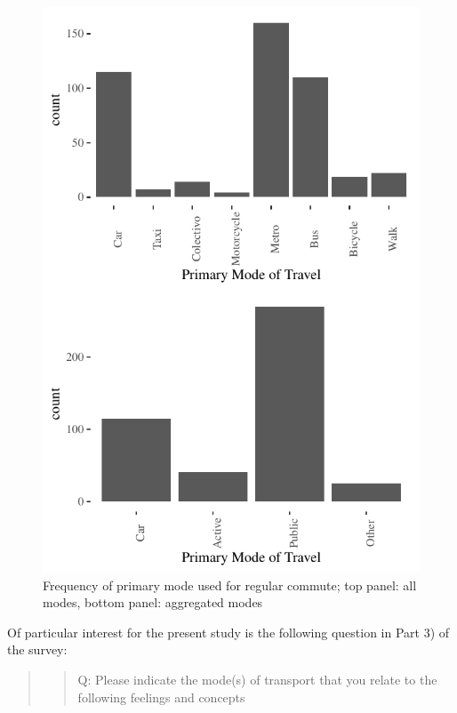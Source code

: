 \documentclass[]{elsarticle} %
\makeatletter
\def\maxwidth{\ifdim\Gin@nat@width>\linewidth\linewidth
\else\Gin@nat@width\fi}
\let\Oldincludegraphics\includegraphics
\renewcommand{\includegraphics}[1]{\Oldincludegraphics[width=\maxwidth]{#1}}
\makeatother
\begin{document}
\begin{figure}
\centering
\includegraphics{Dissonance_Santiago_v1_files/figure-latex/figure-primary-mode-travel-1.pdf}
\caption{\label{fig:primary-mode-travel}Frequency of primary mode used
for regular commute; top panel: all modes, bottom panel: aggregated
modes}
\end{figure}

Of particular interest for the present study is the following question
in Part 3) of the survey:

\begin{quote}
\begin{quote}
Q: Please indicate the mode(s) of transport that you relate to the
following feelings and concepts
\end{quote}
\end{quote}
\end{document}
